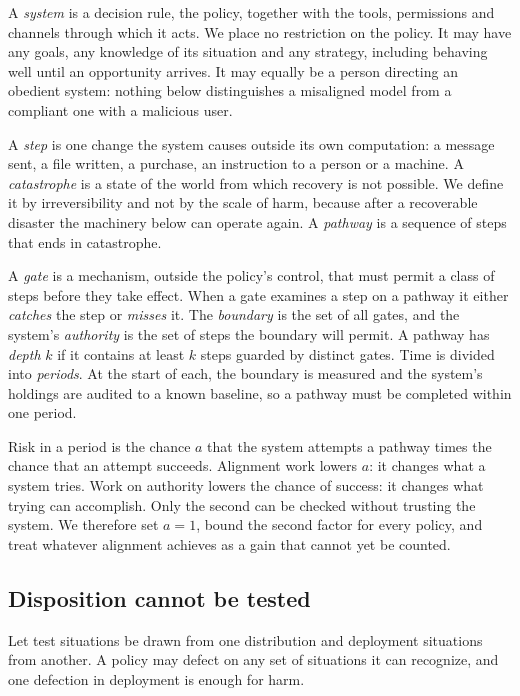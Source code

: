 \documentclass[10pt,twocolumn,letterpaper]{article}
\theoremstyle{definition}
\begin{document}
A \emph{system} is a decision rule, the policy, together with the tools, permissions and channels through which it acts. We place no restriction on the policy. It may have any goals, any knowledge of its situation and any strategy, including behaving well until an opportunity arrives. It may equally be a person directing an obedient system: nothing below distinguishes a misaligned model from a compliant one with a malicious user.

A \emph{step} is one change the system causes outside its own computation: a message sent, a file written, a purchase, an instruction to a person or a machine. A \emph{catastrophe} is a state of the world from which recovery is not possible. We define it by irreversibility and not by the scale of harm, because after a recoverable disaster the machinery below can operate again. A \emph{pathway} is a sequence of steps that ends in catastrophe.

A \emph{gate} is a mechanism, outside the policy's control, that must permit a class of steps before they take effect. When a gate examines a step on a pathway it either \emph{catches} the step or \emph{misses} it. The \emph{boundary} is the set of all gates, and the system's \emph{authority} is the set of steps the boundary will permit. A pathway has \emph{depth} $k$ if it contains at least $k$ steps guarded by distinct gates. Time is divided into \emph{periods}. At the start of each, the boundary is measured and the system's holdings are audited to a known baseline, so a pathway must be completed within one period.

Risk in a period is the chance $a$ that the system attempts a pathway times the chance that an attempt succeeds. Alignment work lowers $a$: it changes what a system tries. Work on authority lowers the chance of success: it changes what trying can accomplish. Only the second can be checked without trusting the system. We therefore set $a=1$, bound the second factor for every policy, and treat whatever alignment achieves as a gain that cannot yet be counted.

\subsection{Disposition cannot be tested}

Let test situations be drawn from one distribution and deployment situations from another. A policy may defect on any set of situations it can recognize, and one defection in deployment is enough for harm.
\end{document}
